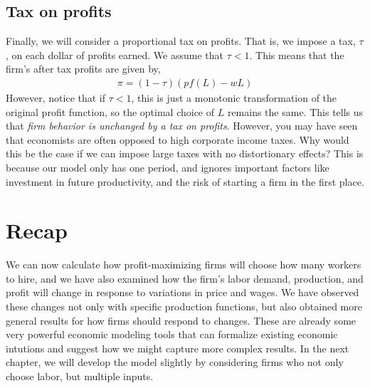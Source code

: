 \subsection*{Tax on profits}
Finally, we will consider a proportional tax on profits. That is, we impose a tax, $\tau$, on each dollar of profits earned. We assume that $\tau < 1$. This means that the firm's after tax profits are given by,
\begin{align*}
    \pi = (1 - \tau) \left(p f(L) - w L \right)
\end{align*}
However, notice that if $\tau < 1$, this is just a monotonic transformation of the original profit function, so the optimal choice of $L$ remains the same. This tells us that \emph{firm behavior is unchanged by a tax on profits}. However, you may have seen that economists are often opposed to high corporate income taxes. Why would this be the case if we can impose large taxes with no distortionary effects? This is because our model only has one period, and ignores important factors like investment in future productivity, and the risk of starting a firm in the first place.

\section*{Recap}
We can now calculate how profit-maximizing firms will choose how many workers to hire, and we have also examined how the firm's labor demand, production, and profit will change in response to variations in price and wages. We have observed these changes not only with specific production functions, but also obtained more general results for how firms should respond to changes. These are already some very powerful economic modeling tools that can formalize existing economic intutions and suggest how we might capture more complex results. In the next chapter, we will develop the model slightly by considering firms who not only choose labor, but multiple inputs. 
